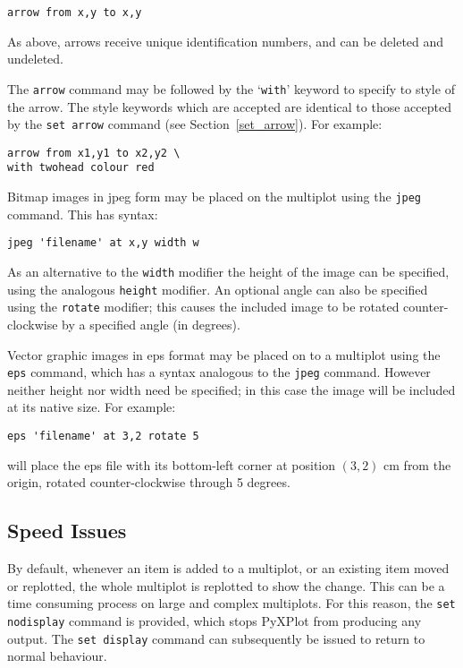 \begin{verbatim} 
arrow from x,y to x,y
\end{verbatim}

As above, arrows receive unique identification numbers, and can be deleted and
undeleted.

The \texttt{arrow} command may be followed by the `\texttt{with}' keyword to
specify to style of the arrow. The style keywords which are accepted are
identical to those accepted by the \texttt{set arrow} command (see
Section~\ref{set_arrow}). For example:

\begin{verbatim} 
arrow from x1,y1 to x2,y2 \
with twohead colour red
\end{verbatim}

 Bitmap images in jpeg form may be
placed on the multiplot using the {\tt jpeg} command.  This has syntax:

\begin{verbatim}
jpeg 'filename' at x,y width w
\end{verbatim}

As an alternative to the {\tt width} modifier the height of the image can be
specified, using the analogous {\tt height} modifier.  An optional angle can
also be specified using the {\tt rotate} modifier; this causes the included
image to be rotated counter-clockwise by a specified angle (in degrees).

 Vector graphic images in eps format may
be placed on to a multiplot using the {\tt eps} command, which has a syntax
analogous to the {\tt jpeg} command.  However neither height nor width need be
specified; in this case the image will be included at its native size.  For
example:

\begin{verbatim}
eps 'filename' at 3,2 rotate 5
\end{verbatim}

\noindent will place the eps file with its bottom-left corner at position
$(3,2)$ cm from the origin, rotated counter-clockwise through 5 degrees.

\subsection{Speed Issues}
\label{set_display}

By default, whenever an item is added to a multiplot, or an existing item moved
or replotted, the whole multiplot is replotted to show the change. This can be
a time consuming process on large and complex multiplots. For this reason, the
\texttt{set nodisplay}\index{set display command@\texttt{set display} command}
command is provided, which stops PyXPlot from producing any output. The
\texttt{set display} command can subsequently be issued to return to normal
behaviour.

